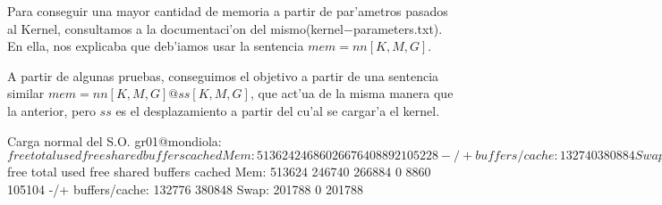 Para conseguir una mayor cantidad de memoria a partir de par'ametros
pasados al Kernel, consultamos a la documentaci'on del
mismo(kernel$-$parameters.txt). En ella, nos explicaba que deb'iamos
usar la sentencia $mem=nn[K,M,G]$.

A partir de algunas pruebas, conseguimos el objetivo a partir de una
sentencia similar $mem=nn[K,M,G]@ss[K,M,G]$, que act'ua de la misma
manera que la anterior, pero $ss$ es el desplazamiento a partir del
cu'al se cargar'a el kernel.

\begin{envCodigo}
Carga normal del S.O.
gr01@mondiola:~$ free
             total       used       free     shared    buffers     cached
Mem:        513624     246860     266764          0       8892     105228
-/+ buffers/cache:     132740     380884
Swap:       201788          0     201788


Agregando a la linea del kernel en el grub mem=510M@64M
gr01@mondiola:~$ free
             total       used       free     shared    buffers     cached
Mem:        513624     246740     266884          0       8860     105104
-/+ buffers/cache:     132776     380848
Swap:       201788          0     201788
\end{envCodigo}
